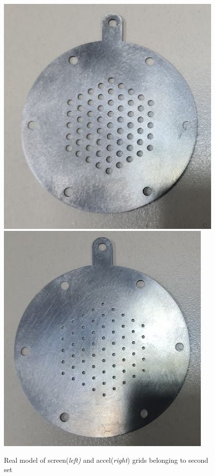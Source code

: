\begin{figure}[ht]
    \centering
    \includegraphics[scale=.35]{fig/screen_5_real.jpeg}
    \includegraphics[scale=.37]{fig/accel_5_real.jpeg}
    \caption{Real model of screen(\textit{left)} and accel(\textit{right}) grids belonging to second set}
    \label{fig:real_secondset}
\end{figure}

